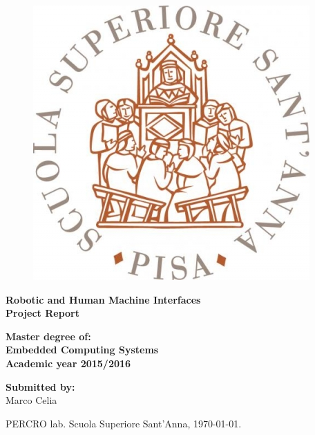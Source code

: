 \documentclass[a4paper,12pt]{article}
\begin{document}
\newpage
\clearpage
\thispagestyle{empty}


\begin{center} 
	
	\begin{figure}[h]
		\center
		\includegraphics[scale=0.4]{img/sannalogo.png}
	\end{figure}
	
	\vspace{50pt}
	
	
	
	\textbf{\Large Robotic and Human Machine Interfaces}\\
	\vspace{5pt}
	\textbf{  {Project Report}}
	\vspace{50pt}
	
	\textbf{Master degree of:}\\
	\vspace{10pt}
	\textbf{{\Large Embedded Computing Systems}}\\
	\vspace{10pt}
	\textbf{Academic year 2015/2016}\\
	\vspace{50pt}
	
	
	\vspace{60pt}
	\textbf{Submitted by:}\\
	Marco Celia
	
	
	\vspace{100pt}
	
	
	PERCRO lab. Scuola Superiore Sant'Anna, \today.
	
	
	
\end{center}
\newpage
\clearpage
\thispagestyle{empty}


\newpage
\tableofcontents
\clearpage
\listoffigures
\clearpage
\clearpage






\end{document}
